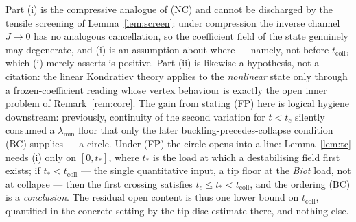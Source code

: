 \begin{remark}
    \label{rem:fp}
    Part (i) is the compressive analogue of (NC) and cannot be discharged by the tensile screening of
    Lemma~\ref{lem:screen}: under compression the inverse channel $J\to0$ has no analogous cancellation, so the
    coefficient field of the state genuinely may degenerate, and (i) is an assumption about where --- namely, not
    before $t_{\mathrm{coll}}$, which (i) merely asserts is positive. Part (ii) is likewise a hypothesis, not a
    citation: the linear Kondratiev theory applies to the \emph{nonlinear} state only through a
    frozen-coefficient reading whose vertex behaviour is exactly the open inner problem of Remark~\ref{rem:core}.
    The gain from stating (FP) here is logical hygiene downstream: previously, continuity of the second variation
    for $t<t_c$ silently consumed a $\lambda_{\min}$ floor that only the later buckling-precedes-collapse condition
    (BC) supplies --- a circle. Under (FP) the circle opens into a line: Lemma~\ref{lem:tc} needs (i) only on
    $[0,t_*]$, where $t_*$ is the load at which a destabilising field first exists; if $t_*<t_{\mathrm{coll}}$
    --- the single quantitative input, a tip floor at the \emph{Biot} load, not at collapse --- then the first
    crossing satisfies $t_c\le t_*<t_{\mathrm{coll}}$, and the ordering (BC) is a \emph{conclusion}. The residual
    open content is thus one lower bound on $t_{\mathrm{coll}}$, quantified in the concrete setting by the tip-disc
    estimate there, and nothing else.
\end{remark}


